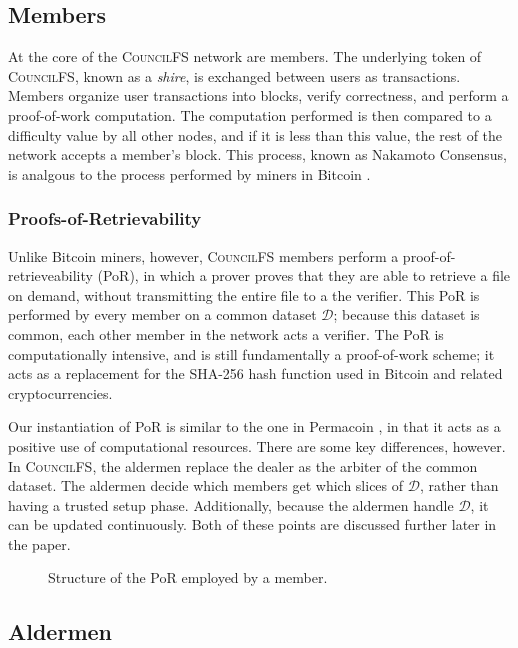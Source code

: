 \documentclass{article}
\begin{document}
\subsection{Members}

At the core of the \textsc{CouncilFS} network are members. The underlying token
of \textsc{CouncilFS}, known as a \emph{shire}, is exchanged between users as
transactions. Members organize user transactions into blocks, verify
correctness, and perform a proof-of-work computation. The computation performed
is then compared to a difficulty value by all other nodes, and if it is less
than this value, the rest of the network accepts a member's block. This process,
known as Nakamoto Consensus, is analgous to the process performed by miners in
Bitcoin \cite{btc}.

\subsubsection{Proofs-of-Retrievability}

Unlike Bitcoin miners, however, \textsc{CouncilFS} members perform a
proof-of-retrieveability (PoR), in which a prover proves that they are able to
retrieve a file on demand, without transmitting the entire file to a the
verifier. This PoR is performed by every member on a common dataset
$\mathcal{D}$; because this dataset is common, each other member in the network
acts a verifier. The PoR is computationally intensive, and is still
fundamentally a proof-of-work scheme; it acts as a replacement for the SHA-256
hash function used in Bitcoin and related cryptocurrencies.

Our instantiation of PoR is similar to the one in Permacoin \cite{perma}, in
that it acts as a positive use of computational resources. There are some key
differences, however. In \textsc{CouncilFS}, the aldermen replace the dealer as
the arbiter of the common dataset. The aldermen decide which members get which
slices of $\mathcal{D}$, rather than having a trusted setup phase. Additionally,
because the aldermen handle $\mathcal{D}$, it can be updated continuously. Both
of these points are discussed further later in the paper.

\begin{figure}[t]
  \centering
  \fbox{\rule[-.5cm]{4cm}{4cm} \rule[-.5cm]{4cm}{0cm}}
  \caption{Structure of the PoR employed by a member.}
  \label{fig:por-member}
\end{figure}

\subsection{Aldermen}
\end{document}

